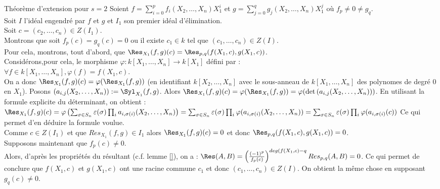Théorème d'extension pour $s=2$
Soient $f=\sum_{i=0}^p f_i(X_2,\ldots,X_n)X_1^i$ et $g=\sum_{j=0}^q g_j(X_2,\ldots,X_n)X_1^j$ où $f_p \neq 0 \neq g_q$. \\
Soit $I$ l'idéal engendré par $f$ et $g$ et $I_1$ son premier idéal d'élimination.\\
Soit $c=(c_2,\ldots,c_n) \in Z(I_1)$.\\
Montrons que soit $f_p(c)=g_q(c)=0$ ou il existe $c_1 \in k$ tel que $(c_1,\ldots,c_n) \in Z(I)$.\\

Pour cela, montrons, tout d'abord, que $\Res_{X_1}(f,g)(c)=\Res_{p,q}(f(X_1,c),g(X_1,c))$.\\
Considérons,pour cela, le morphisme $\varphi : k[X_1,\ldots,X_n]\to k[X_1]$ défini par : \\
$\forall f \in k[X_1,\ldots,X_n],\varphi(f)=f(X_1,c)$.\\
On a donc $\Res_{X_1}(f,g)(c)=\varphi(\Res_{X_1}(f,g))$ (en identifiant $k[X_2,\ldots,X_n]$ avec le sous-anneau de $k[X_1,\ldots,X_n]$ des polynomes de degré 0 en $X_1$).
Posons $\left(a_{i,j}(X_2,\ldots,X_n)\right):=\Syl_{X_1}(f,g)$.
Alors $\Res_{X_1}(f,g)(c)=\varphi(\Res_{X_1}(f,g))=\varphi(\det\left(a_{i,j}(X_2,\ldots,X_n)\right))$.
En utilisant la formule explicite du déterminant, on obtient : 
$\Res_{X_1}(f,g)(c)=\varphi\left(\sum_{\sigma \in S_n } \varepsilon(\sigma) \prod_i a_{i,\sigma(i)}(X_2,\ldots,X_n)\right)=\sum_{\sigma \in S_n } \varepsilon(\sigma) \prod_i \varphi(a_{i,\sigma(i)}(X_2,\ldots,X_n))=\sum_{\sigma \in S_n } \varepsilon(\sigma) \prod_i \varphi(a_{i,\sigma(i)}(c))$
Ce qui permet d'en déduire la formule voulue.\\

Comme $c \in Z(I_1)$ et que $Res_{X_1}(f,g) \in I_1$ alors $\Res_{X_1}(f,g)(c)=0$ et donc $\Res_{p,q}(f(X_1,c),g(X_1,c))=0$.\\
Supposons maintenant que $f_p(c) \neq 0$. \\
Alors, d'après les propriétés du résultant (c.f. lemme \ref{}), on a : $\Res(A,B)=\left(\frac{(-1)^p}{f_p(c)}\right)^{deg(f(X_1,c)-q}Res_{p,q}(A,B)=0$.
Ce qui permet de conclure que $f(X_1,c)$ et $g(X_1,c)$ ont une racine commune $c_1$ et donc $(c_1,\ldots,c_n) \in Z(I)$.
On obtient la m\^eme chose en supposant $g_q(c) \neq 0$.



